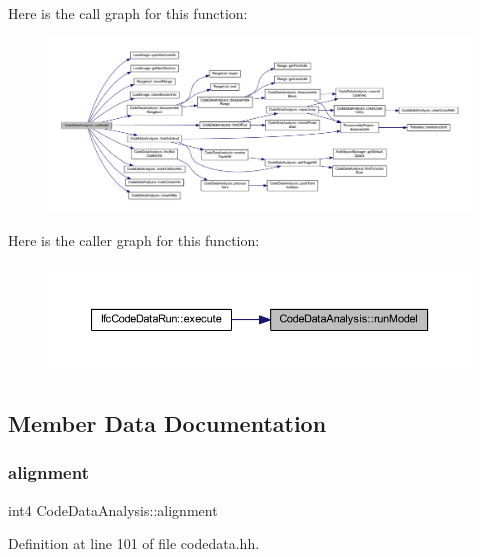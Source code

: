 Here is the call graph for this function\+:
\nopagebreak
\begin{figure}[H]
\begin{center}
\leavevmode
\includegraphics[width=350pt]{class_code_data_analysis_af2376b45db9a51691d61a95d07220786_cgraph}
\end{center}
\end{figure}
Here is the caller graph for this function\+:
\nopagebreak
\begin{figure}[H]
\begin{center}
\leavevmode
\includegraphics[width=350pt]{class_code_data_analysis_af2376b45db9a51691d61a95d07220786_icgraph}
\end{center}
\end{figure}


\subsection{Member Data Documentation}
\mbox{\label{class_code_data_analysis_a1f4e342373fe3b26b02fc9cc07fc4cde}} 
\subsubsection{\texorpdfstring{alignment}{alignment}}
{\footnotesize\ttfamily int4 Code\+Data\+Analysis\+::alignment}



Definition at line 101 of file codedata.\+hh.

